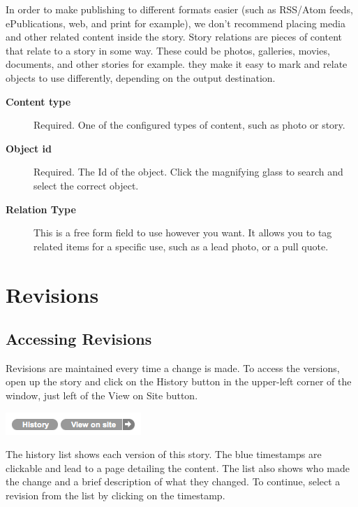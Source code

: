 \documentclass[letterpaper,10pt,english]{manual}
\begin{document}
In order to make publishing to different formats easier (such as RSS/Atom feeds, ePublications, web, and print for example), we don't recommend placing media and other related content inside the story. Story relations are pieces of content that relate to a story in some way. These could be photos, galleries, movies, documents, and other stories for example. they make it easy to mark and relate objects to use differently, depending on the output destination.
\begin{description}
\item[\textbf{Content type}] \leavevmode
Required. One of the configured types of content, such as photo or story.

\item[\textbf{Object id}] \leavevmode
Required. The Id of the object. Click the magnifying glass to search and select the correct object.

\item[\textbf{Relation Type}] \leavevmode
This is a free form field to use however you want. It allows you to tag related items for a specific use, such as a lead photo, or a pull quote.

\end{description}

\resetcurrentobjects
\hypertarget{--doc-user/revisions}{}

\hypertarget{revisions}{}\section{Revisions}


\subsection{Accessing Revisions}

Revisions are maintained every time a change is made. To access the versions, open up the story and click on the History button in the upper-left corner of the window, just left of the View on Site button.

\includegraphics{history_btn.png}

The history list shows each version of this story. The blue timestamps are clickable and lead to a page detailing the content. The list also shows who made the change and a brief description of what they changed. To continue, select a revision from the list by clicking on the timestamp.
\end{document}

